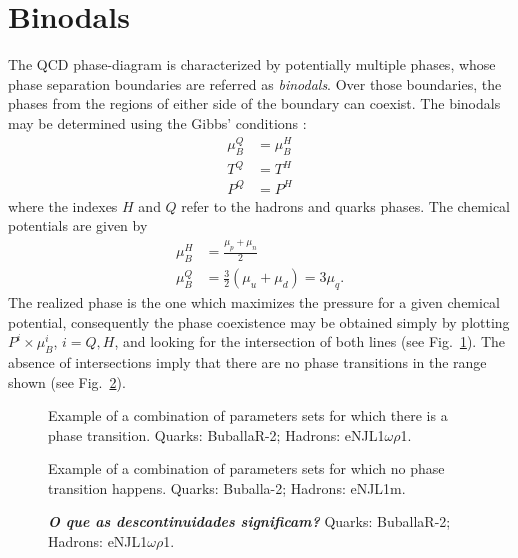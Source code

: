 \documentclass[prc, reprint, amsmath, floatfix, linenumbers,10pt]{revtex4-1}
\newcommand{\comment}[1]{{\bf\textit{#1}}}
\begin{document}
\section{Binodals}

The QCD phase-diagram is characterized by potentially multiple phases, whose phase separation boundaries are referred as \emph{binodals}. Over those boundaries, the phases from the regions of either side of the boundary can coexist. The binodals may be determined using the Gibbs' conditions \cite{Cavagnoli2011}:
\begin{align}
\mu_B^Q &= \mu_B^H \\
T^Q &= T^H \\
P^Q &= P^H
\end{align}
%
where the indexes $H$ and $Q$ refer to the hadrons and quarks phases. The chemical potentials are given by
\begin{align}
	\mu_B^H &= \frac{\mu_p + \mu_n}{2} \\
	\mu_B^Q &= \frac{3}{2} (\mu_u + \mu_d) = 3 \mu_q.
\end{align}
%
The realized phase is the one which maximizes the pressure for a given chemical potential, consequently the phase coexistence may be obtained simply by plotting $P^i \times \mu_B^i$, $i = Q, H$, and looking for the intersection of both lines (see Fig.~\ref{Fig:Intersection}). The absence of intersections imply that there are no phase transitions in the range shown (see Fig.~\ref{Fig:NoIntersection}).

\begin{figure}
	
	\caption{Example of a combination of parameters sets for which there is a phase transition. Quarks: BuballaR-2; Hadrons: eNJL1$\omega\rho$1. \label{Fig:Intersection}}
\end{figure}

\begin{figure}
	
	\caption{Example of a combination of parameters sets for which no phase transition happens. Quarks: Buballa-2; Hadrons: eNJL1m. \label{Fig:NoIntersection}}
\end{figure}

\begin{figure}
	
	\caption{\comment{O que as descontinuidades significam?} Quarks: BuballaR-2; Hadrons: eNJL1$\omega\rho$1.}
\end{figure}
\end{document}
